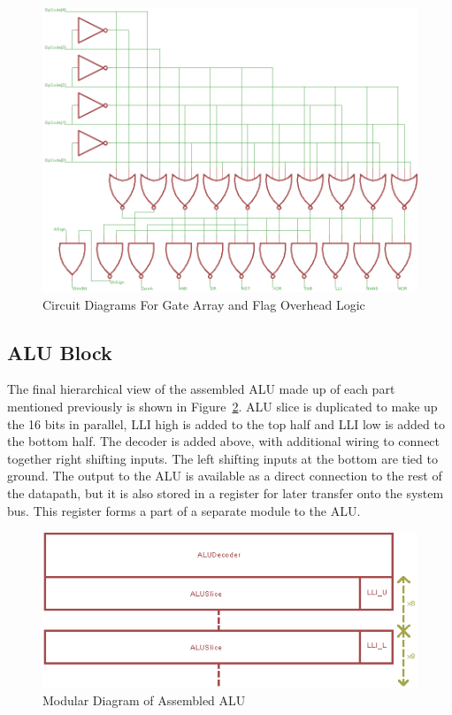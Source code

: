 \begin{figure}[h]
	\centering
	\includegraphics[scale=0.75]{Figures/ALUDecoderGateArrayv2.png}
	\caption{Circuit Diagrams For Gate Array and Flag Overhead Logic}
	\label{fig:GateArray}
\end{figure}

\subsection{ALU Block}
The final hierarchical view of the assembled ALU made up of each part mentioned previously is shown in Figure~\ref{fig:ALUAssembled}. 
ALU slice is duplicated to make up the 16 bits in parallel, LLI high is added to the top half and LLI low is added to the bottom half. 
The decoder is added above, with additional wiring to connect together right shifting inputs. 
The left shifting inputs at the bottom are tied to ground. 
The output to the ALU is available as a direct connection to the rest of the datapath, but it is also stored in a register for later transfer onto the system bus. 
This register forms a part of a separate module to the ALU. 

\begin{figure}[h]
	\centering
	\includegraphics[scale=0.75]{Figures/ALUModular.png}
	\caption{Modular Diagram of Assembled ALU}
	\label{fig:ALUAssembled}
\end{figure}
